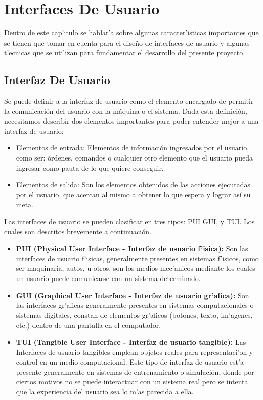 \chapter{Interfaces De Usuario}
\label{capitulotres}

Dentro de este cap'itulo se hablar'a sobre algunas caracter'isticas importantes que se tienen que tomar en cuenta para el dise\~no de interfaces de usuario y algunas t'ecnicas que se utilizan para fundamentar el desarrollo del presente proyecto.

\section{Interfaz De Usuario}
Se puede definir a la interfaz de usuario como el elemento encargado de permitir la comunicación del usuario con la máquina o el sistema. Dada esta definición, necesitamos describir dos elementos importantes para poder entender mejor a una interfaz de usuario:

\begin{itemize}
	\item Elementos de entrada: Elementos  de información ingresados por el usuario, como ser: órdenes, comandos o cualquier otro elemento que el usuario pueda ingresar como pauta de lo que quiere conseguir.

	\item Elementos de salida: Son los elementos obtenidos de las acciones ejecutadas por el usuario, que acercan al mismo a obtener lo que espera y lograr así su meta.
\end{itemize}

\medskip
Las interfaces de usuario se pueden clasificar en tres tipos: PUI GUI, y TUI. Los cuales son descritos brevemente a continuación.

\begin{itemize}
	\item \textbf{PUI (Physical User Interface - Interfaz de usuario f'isica):} Son las interfaces de usuario f'isicas, generalmente presentes en sistemas f'isicos, como ser maquinaria, autos, u otros, son los medios mec'anicos mediante los cuales un usuario puede comunicarse con un sistema determinado.
 
	\item \textbf{ GUI (Graphical User Interface - Interfaz de usuario gr'afica):} Son las interfaces gr'aficas generalmente presentes en sistemas computacionales o sistemas digitales, constan de elementos gr'aficos (botones, texto, im'agenes, etc.) dentro de una pantalla en el computador.

	\item \textbf{TUI (Tangible User Interface - Interfaz de usuario tangible):} Las Interfaces de usuario tangibles emplean objetos reales para representaci'on y control en un medio computacional. Este tipo de interfaz de usuario est'a presente generalmente en sistemas de entrenamiento o simulación, donde por ciertos motivos no se puede interactuar con un sistema real pero se intenta que la experiencia del usuario sea lo m'as parecida a ella.
\end{itemize}
\medskip

